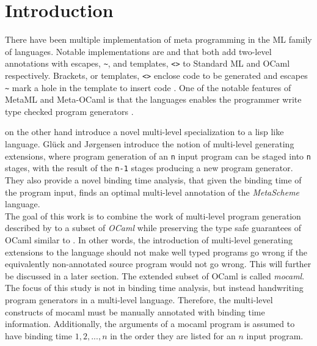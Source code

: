 
\section{Introduction}
There have been multiple implementation of meta programming in the ML family of languages. Notable implementations are \cite{metaML} and \cite{metaOCaml} that both add two-level annotations with escapes, \texttt{\~}, and templates, \texttt{<>} to Standard ML and OCaml respectively. Brackets, or templates, \texttt{<>} enclose code to be generated and escapes \texttt{\~} mark a hole in the template to insert code \cite{metaOCaml}. One of the notable features of MetaML and Meta-OCaml is that the languages enables the programmer write type checked program generators \cite{metaOCaml}.

\cite{multilevel} on the other hand introduce a novel multi-level specialization
to a lisp like language. Glück and Jørgensen introduce the notion of multi-level generating extensions, where program generation of an \texttt{n} input program can be staged into \texttt{n} stages, with the result of the \texttt{n-1} stages producing a new program generator. They also provide a novel binding time analysis, that given the binding time of the program input, finds an optimal multi-level annotation of the \textit{MetaScheme} language.\\

The goal of this work is to combine the work of multi-level program generation described by \cite{multilevel} to a subset of \textit{OCaml} while preserving the type safe guarantees of OCaml similar to \cite{metaOCaml}. In other words, the introduction of multi-level generating extensions to the language should not make well typed programs go wrong if the equivalently non-annotated source program would not go wrong. This will further be discussed in a later section. The extended subset of OCaml is called \textit{mocaml}. %
The focus of this study is not in binding time analysis, but instead handwriting program generators in a multi-level language. Therefore, the multi-level constructs of mocaml must be manually annotated with binding time information. Additionally, the arguments of a mocaml program is assumed to have binding time $1,2,...,n$ in the order they are listed for an $n$ input program.


